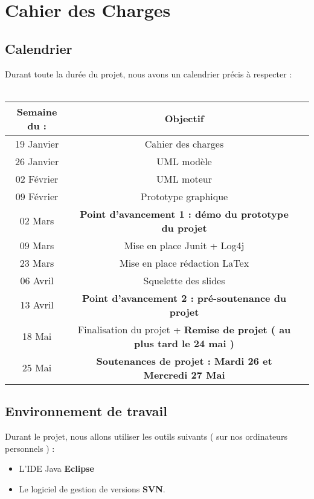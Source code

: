 \section{Cahier des Charges}
	
  \subsection{Calendrier}

  Durant toute la durée du projet, nous avons un calendrier précis à respecter :  \\ \\
  \begin{tabular}{|c|c|c|}
  \hline \textbf{Semaine du : } & \textbf{Objectif} \\
  \hline 19 Janvier & Cahier des charges \\
  \hline 26 Janvier & UML modèle \\
  \hline 02 Février & UML moteur \\
  \hline 09 Février &Prototype graphique \\
  \hline 02 Mars & \textbf{Point d'avancement 1 : démo du prototype du projet} \\
  \hline 09 Mars & Mise en place Junit + Log4j \\
  \hline 23 Mars & Mise en place rédaction LaTex \\
  \hline 06 Avril & Squelette des slides \\
  \hline 13 Avril & \textbf{Point d'avancement 2 : pré-soutenance du projet} \\
  \hline 18 Mai & Finalisation du projet + \textbf{Remise de projet ( au plus tard le 24 mai )} \\
  \hline 25 Mai & \textbf{Soutenances de projet : Mardi 26 et Mercredi 27 Mai} \\
  \hline 
  \end{tabular}
	
  \subsection{Environnement de travail}
  Durant le projet, nous allons utiliser les outils suivants ( sur nos ordinateurs personnels ) : \begin{itemize}
  \item L'IDE Java \textbf{Eclipse}
  \item Le logiciel de gestion de versions \textbf{SVN}.
  \end{itemize}


